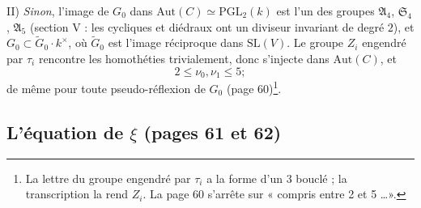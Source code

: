 \documentclass[11pt,a4paper]{article}
\begin{document}
II) \emph{Sinon}, l'image de $G_0$ dans $\mathrm{Aut}(C) \simeq
\mathrm{PGL}_2(k)$ est l'un des groupes $\mathfrak{A}_4$, $\mathfrak{S}_4$,
$\mathfrak{A}_5$ (section V : les cycliques et diédraux ont un diviseur
invariant de degré $2$), et $G_0 \subset \widetilde{G}_0 \cdot k^\times$, où
$\widetilde{G}_0$ est l'image réciproque dans $\mathrm{SL}(V)$. Le groupe
$Z_i$ engendré par $\tau_i$ rencontre les homothéties trivialement, donc
s'injecte dans $\mathrm{Aut}(C)$, et
\[
  2 \leq \nu_0, \nu_1 \leq 5 ;
\]
de même pour toute pseudo-réflexion de $G_0$ (page 60)\footnote{La lettre du
groupe engendré par $\tau_i$ a la forme d'un $3$ bouclé ; la transcription la
rend $Z_i$. La page 60 s'arrête sur « compris entre 2 et 5 \ldots ».}.

\subsection*{L'équation de $\xi$ (pages 61 et 62)}
\end{document}
